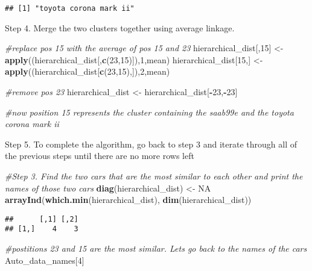 \documentclass[11pt,]{article}
\newenvironment{Shaded}{\begin{snugshade}}{\end{snugshade}}
\newcommand{\CommentTok}[1]{\textcolor[rgb]{0.56,0.35,0.01}{\textit{#1}}}
\newcommand{\DecValTok}[1]{\textcolor[rgb]{0.00,0.00,0.81}{#1}}
\newcommand{\KeywordTok}[1]{\textcolor[rgb]{0.13,0.29,0.53}{\textbf{#1}}}
\newcommand{\NormalTok}[1]{#1}
\newcommand{\OperatorTok}[1]{\textcolor[rgb]{0.81,0.36,0.00}{\textbf{#1}}}
\newcommand{\OtherTok}[1]{\textcolor[rgb]{0.56,0.35,0.01}{#1}}
\newcommand{\StringTok}[1]{\textcolor[rgb]{0.31,0.60,0.02}{#1}}
\begin{document}
\begin{verbatim}
## [1] "toyota corona mark ii"
\end{verbatim}

Step 4. Merge the two clusters together using average linkage.

\begin{Shaded}
\begin{Highlighting}[]
\CommentTok{#replace pos 15 with the average of pos 15 and 23}
\NormalTok{hierarchical_dist[,}\DecValTok{15}\NormalTok{] <-}\StringTok{ }\KeywordTok{apply}\NormalTok{((hierarchical_dist[,}\KeywordTok{c}\NormalTok{(}\DecValTok{23}\NormalTok{,}\DecValTok{15}\NormalTok{)]),}\DecValTok{1}\NormalTok{,mean)}
\NormalTok{hierarchical_dist[}\DecValTok{15}\NormalTok{,] <-}\StringTok{ }\KeywordTok{apply}\NormalTok{((hierarchical_dist[}\KeywordTok{c}\NormalTok{(}\DecValTok{23}\NormalTok{,}\DecValTok{15}\NormalTok{),]),}\DecValTok{2}\NormalTok{,mean)}

\CommentTok{#remove pos 23}
\NormalTok{hierarchical_dist <-}\StringTok{ }\NormalTok{hierarchical_dist[}\OperatorTok{-}\DecValTok{23}\NormalTok{,}\OperatorTok{-}\DecValTok{23}\NormalTok{]}

\CommentTok{#now position 15 represents the cluster containing the saab99e and the toyota corona mark ii}
\end{Highlighting}
\end{Shaded}

Step 5. To complete the algorithm, go back to step 3 and iterate through
all of the previous steps until there are no more rows left

\begin{Shaded}
\begin{Highlighting}[]
\CommentTok{#Step 3. Find the two cars that are the most similar to each other and print the names of those two cars}
\KeywordTok{diag}\NormalTok{(hierarchical_dist) <-}\StringTok{ }\OtherTok{NA}
\KeywordTok{arrayInd}\NormalTok{(}\KeywordTok{which.min}\NormalTok{(hierarchical_dist), }\KeywordTok{dim}\NormalTok{(hierarchical_dist))}
\end{Highlighting}
\end{Shaded}

\begin{verbatim}
##      [,1] [,2]
## [1,]    4    3
\end{verbatim}

\begin{Shaded}
\begin{Highlighting}[]
\CommentTok{#postitions 23 and 15 are the most similar. Lets go back to the names of the cars}
\NormalTok{Auto_data_names[}\DecValTok{4}\NormalTok{]}
\end{Highlighting}
\end{Shaded}
\end{document}
